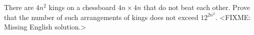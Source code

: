 \problem
There are $4 n^2$ kings on a chessboard $4 n \times 4 n$ that do not beat each
other.
Prove that the number of such arrangements of kings does not exceed
$12^{2n^2}$.
\solution
<FIXME: Missing English solution.>
\endproblem

